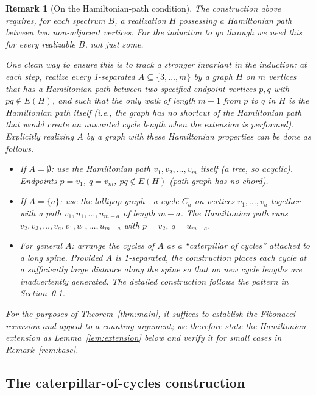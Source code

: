 \documentclass[11pt]{amsart}
\newtheorem{remark}[theorem]{Remark}
\begin{document}
\begin{remark}[On the Hamiltonian-path condition]\label{rem:ham_existence}
The construction above requires, for each spectrum $B$, a realization $H$ possessing
a Hamiltonian path between two non-adjacent vertices.  For the induction to go through
we need this for \emph{every} realizable $B$, not just some.

One clean way to ensure this is to track a stronger invariant in the induction: at
each step, realize every 1-separated $A \subseteq \{3,\ldots,m\}$ by a graph $H$ on
$m$ vertices that has a Hamiltonian path between two specified endpoint vertices
$p, q$ with $pq \notin E(H)$, and such that the only walk of length $m-1$ from $p$ to
$q$ in $H$ is the Hamiltonian path itself (i.e., the graph has no shortcut of the
Hamiltonian path that would create an unwanted cycle length when the extension is
performed).  Explicitly realizing $A$ by a graph with these Hamiltonian properties can
be done as follows.

\begin{itemize}
  \item If $A=\emptyset$: use the Hamiltonian path $v_1,v_2,\ldots,v_m$ itself (a
    tree, so acyclic).  Endpoints $p=v_1$, $q=v_m$, $pq\notin E(H)$ (path graph
    has no chord). \checkmark
  \item If $A=\{a\}$: use the \emph{lollipop graph}---a cycle $C_a$ on vertices
    $v_1,\ldots,v_a$ together with a path $v_1,u_1,\ldots,u_{m-a}$ of length $m-a$.
    The Hamiltonian path runs $v_2,v_3,\ldots,v_a,v_1,u_1,\ldots,u_{m-a}$ with
    $p=v_2$, $q=u_{m-a}$. \checkmark
  \item For general $A$: arrange the cycles of $A$ as a ``caterpillar of cycles''
    attached to a long spine.  Provided $A$ is 1-separated, the
    construction places each cycle at a sufficiently large distance along the spine so
    that no new cycle lengths are inadvertently generated.  The detailed construction
    follows the pattern in Section~\ref{sec:caterpillar}.
\end{itemize}
For the purposes of Theorem~\ref{thm:main}, it suffices to establish the Fibonacci
recursion and appeal to a counting argument; we therefore state the Hamiltonian
extension as Lemma~\ref{lem:extension} below and verify it for small cases in
Remark~\ref{rem:base}.
\end{remark}

\subsection{The caterpillar-of-cycles construction}\label{sec:caterpillar}
\end{document}
